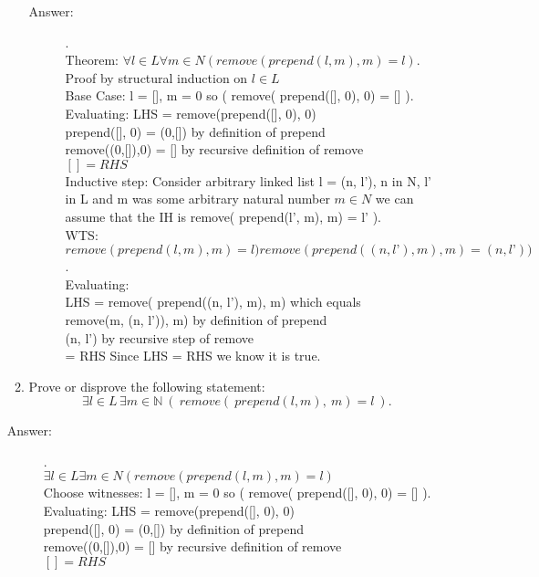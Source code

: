 \documentclass[12pt, oneside]{article}
\begin{document}
\begin{enumerate}
\begin{enumerate}
\begin{description}
    \item[Answer:] .\\
    Theorem: $\forall l \in L \forall m \in N ( remove( prepend(l, m), m) = l )$.\\
    Proof by structural induction on $l \in L$\\
    Base Case: l = [], m = 0 so ( remove( prepend([], 0), 0) = [] ).\\
    Evaluating: LHS = remove(prepend([], 0), 0)\\
    prepend([], 0)  = (0,[]) by definition of prepend\\
    remove((0,[]),0) = [] by recursive definition of remove\\
    $[] = RHS$\\
            
    Inductive step: Consider arbitrary linked list l = (n, l’), n in N, l’ in L and m was some arbitrary natural number $m \in N$ we can assume that the IH is  remove( prepend(l’, m), m) = l’ ).\\

    WTS: $remove( prepend(l, m), m) = l)  remove( prepend((n, l’), m), m) = (n, l’) )$.\\
    Evaluating:\\
    LHS = remove( prepend((n, l’), m), m) which equals\\
    remove(m, (n, l’)), m)  by definition of prepend\\
    (n, l’) by recursive step of remove\\
    = RHS Since LHS = RHS we know it is true.
\end{description}

\item Prove or disprove the following statement: 
$$\exists l \in L \, \exists m \in \mathbb{N}~(~remove(~prepend(l,m),~m) = l~).$$
\end{enumerate}
\begin{description}
    \item[Answer:] .\\
    $\exists l \in L \exists m \in N ( remove( prepend(l, m), m) = l )$\\
    Choose witnesses: l = [], m = 0 so ( remove( prepend([], 0), 0) = [] ).\\
    Evaluating: LHS = remove(prepend([], 0), 0)\\
    prepend([], 0)  = (0,[]) by definition of prepend\\
    remove((0,[]),0) = [] by recursive definition of remove\\
    $[] = RHS $
\end{description}


\end{enumerate}
\vfill
\end{document}
